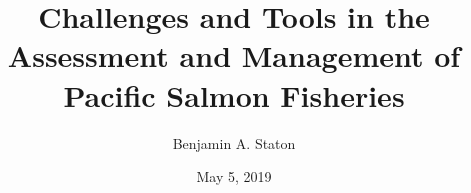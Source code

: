 \usepackage{booktabs}


\usepackage{setspace}
\usepackage{auphd}     %
\usepackage[normalem]{ulem}       %
\usepackage{url}
\usepackage[table]{xcolor}
\usepackage{tikz}
\usepackage{pgf}

\usepackage{amsmath,amsthm, amsfonts, mathrsfs, graphicx, setspace, fullpage, color}
\usepackage{natbib, appendix}
\usepackage[T1]{fontenc}
\usepackage{multirow}
\usepackage{mathabx}
\RequirePackage{adjustbox}
\AtBeginDocument{\renewcommand{\bibname}{References}}
\usepackage{hyperref}



\makeatother
\let\oldmaketitle\maketitle
\AtBeginDocument{\let\maketitle\relax}

\title{Challenges and Tools in the Assessment and Management of Pacific Salmon Fisheries}
\author{Benjamin A. Staton} 
\date{May 5, 2019} %

